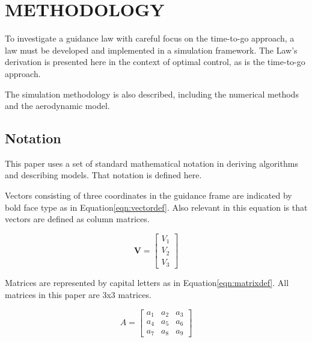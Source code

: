 \chapter{METHODOLOGY}
To investigate a guidance law with careful focus on the time-to-go approach, a law must be developed and implemented in a simulation framework. The Law's derivation is presented here in the context of optimal control, as is the time-to-go approach. 

The simulation methodology is also described, including the numerical methods and the aerodynamic model.

\section{Notation}
This paper uses a set of standard mathematical notation in deriving algorithms and describing models. That notation is defined here.

Vectors consisting of three coordinates in the guidance frame are indicated by bold face type as in Equation\:\ref{eqn:vectordef}. Also relevant in this equation is that vectors are defined as column matrices.

\begin{equation}
\label{eqn:vectordef}
\bm{V} = 
\begin{bmatrix}
V_1 \\
V_2 \\
V_3
\end{bmatrix}
\end{equation}

Matrices are represented by capital letters as in Equation\:\ref{eqn:matrixdef}. All matrices in this paper are 3x3 matrices.

\begin{equation}
\label{eqn:matrixdef}
A = 
\begin{bmatrix}
	a_1 & a_2 & a_3 \\
	a_4 & a_5 & a_6 \\
	a_7 & a_8 & a_9
\end{bmatrix}
\end{equation}

